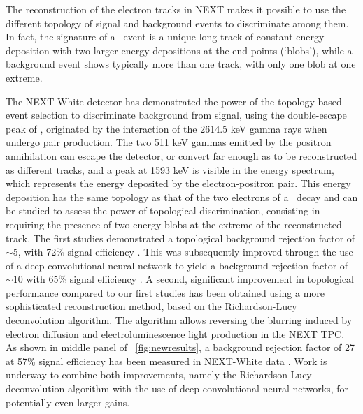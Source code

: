 

The reconstruction of the electron tracks in NEXT makes it possible to use the different topology of signal and background events to discriminate among them. In fact, the signature of a \bbonu ~event is a unique long track of constant energy deposition with two larger energy depositions at the end points (‘blobs’), while a background event shows typically more than one track, with only one blob at one extreme. 



The NEXT-White detector has demonstrated the power of the topology-based event selection to discriminate background from signal, using the double-escape peak of , originated by the interaction of the 2614.5 keV gamma rays when undergo pair production. The two 511 keV gammas emitted by the positron annihilation can escape the detector, or convert far enough as to be reconstructed as different tracks, and a peak at 1593 keV is visible in the energy spectrum, which represents the energy deposited by the electron-positron pair.  This energy deposition has the same topology as that of the two electrons of a \bbonu ~decay and can be studied to assess the power of topological discrimination, consisting in requiring the presence of two energy blobs at the extreme of the reconstructed track.  The first studies demonstrated a topological background rejection factor of $\sim$5, with 72\% signal efficiency \cite{Ferrario:2019kwg}. This was subsequently improved through the use of a deep convolutional neural network to yield a background rejection factor of  $\sim$10 with 65\% signal efficiency \cite{NEXT:2020jmz}. A second, significant improvement in topological performance compared to our first studies has been obtained using a more sophisticated reconstruction method, based on the Richardson-Lucy deconvolution algorithm. The algorithm allows reversing the blurring induced by electron diffusion and electroluminescence light production in the NEXT TPC. As shown in middle panel of \fig\ \ref{fig:newresults}, a  background rejection factor of 27 at 57\% signal efficiency has been measured in NEXT-White data \cite{NEXT:2021pjq}. Work is underway to combine both improvements, namely the Richardson-Lucy deconvolution algorithm with the use of deep convolutional neural networks, for potentially even larger gains.

